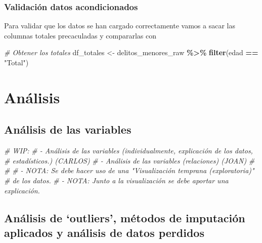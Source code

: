 \documentclass[,,,,pdftex]{Definitions/mdpi}
\newenvironment{Shaded}{\begin{snugshade}}{\end{snugshade}}
\newcommand{\CommentTok}[1]{\textcolor[rgb]{0.56,0.35,0.01}{\textit{#1}}}
\newcommand{\FunctionTok}[1]{\textcolor[rgb]{0.13,0.29,0.53}{\textbf{#1}}}
\newcommand{\NormalTok}[1]{#1}
\newcommand{\OtherTok}[1]{\textcolor[rgb]{0.56,0.35,0.01}{#1}}
\newcommand{\SpecialCharTok}[1]{\textcolor[rgb]{0.81,0.36,0.00}{\textbf{#1}}}
\newcommand{\StringTok}[1]{\textcolor[rgb]{0.31,0.60,0.02}{#1}}
\begin{document}
\subsubsection{Validación datos
acondicionados}\label{validaciuxf3n-datos-acondicionados}

Para validar que los datos se han cargado correctamente vamos a sacar
las columnas totales precaculadas y compararlas con

\begin{Shaded}
\begin{Highlighting}[]
\CommentTok{\# Obtener los totales}
\NormalTok{df\_totales }\OtherTok{\textless{}{-}}\NormalTok{ delitos\_menores\_raw }\SpecialCharTok{\%\textgreater{}\%}
  \FunctionTok{filter}\NormalTok{(edad }\SpecialCharTok{==} \StringTok{"Total"}\NormalTok{)}
\end{Highlighting}
\end{Shaded}

\section{Análisis}\label{anuxe1lisis}

\subsection{Análisis de las
variables}\label{anuxe1lisis-de-las-variables}

\begin{Shaded}
\begin{Highlighting}[]
\CommentTok{\# WIP:}
\CommentTok{\#   {-} Análisis de las variables (individualmente, explicación de los datos,}
\CommentTok{\#                                estadísticos.) (CARLOS)}
\CommentTok{\#   {-} Análisis de las variables (relaciones) (JOAN)}
\CommentTok{\# }
\CommentTok{\#}
\CommentTok{\# {-} NOTA: Se debe hacer uso de una "Visualización temprana (exploratoria)"}
\CommentTok{\#   de los datos. }
\CommentTok{\# {-} NOTA: Junto a la visualización se debe aportar una explicación.}
\end{Highlighting}
\end{Shaded}

\subsection{Análisis de `outliers', métodos de imputación aplicados y
análisis de datos
perdidos}\label{anuxe1lisis-de-outliers-muxe9todos-de-imputaciuxf3n-aplicados-y-anuxe1lisis-de-datos-perdidos}
\end{document}
